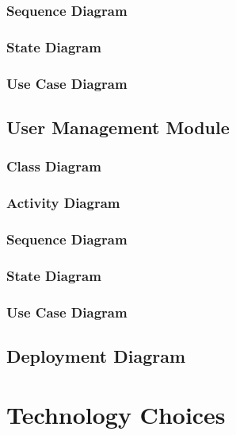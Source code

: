 \documentclass{article}
\begin{document}
			
			\subsubsection{Sequence Diagram}\label{subsec:uml-diagrams-poi-seq}
						
			
			\subsubsection{State Diagram}\label{subsec:uml-diagrams-poi-state}
			
			
			\subsubsection{Use Case Diagram}\label{subsec:uml-diagrams-poi-uc}
		
		\clearpage
	
		\subsection{User Management Module}\label{subsec:uml-diagrams-users}
			
		
			\subsubsection{Class Diagram}\label{subsec:uml-diagrams-users-class}
			
			
			\subsubsection{Activity Diagram}\label{subsec:uml-diagrams-users-act}
			
			
			\subsubsection{Sequence Diagram}\label{subsec:uml-diagrams-users-seq}
						
			
			\subsubsection{State Diagram}\label{subsec:uml-diagrams-users-state}
			
			
			\subsubsection{Use Case Diagram}\label{subsec:uml-diagrams-users-uc}
		
	\clearpage
	
	\subsection{Deployment Diagram}\label{subsec:deployment-diagram}

	\clearpage
	
	\section{Technology Choices}\label{sec:technology-choices}
\end{document}
